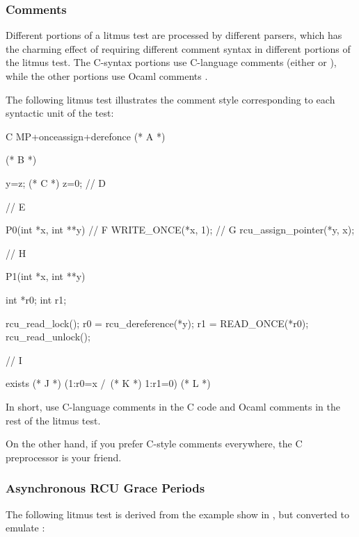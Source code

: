 \subsubsection{Comments}

Different portions of a litmus test are processed by different parsers,
which has the charming effect of requiring different comment syntax in
different portions of the litmus test.
The C-syntax portions use C-language comments (either \qco{/* */} or \qco{//}),
while the other portions use Ocaml comments \qco{(* *)}.

The following litmus test illustrates the comment style corresponding
to each syntactic unit of the test:

\begin{VerbatimN}[commandchars=\%\@\$]
	C MP+onceassign+derefonce (* A *)

	(* B *)

	{
	y=z; (* C *)
	z=0;
	} // D

	// E

	P0(int *x, int **y) // F
	{
		WRITE_ONCE(*x, 1);  // G
		rcu_assign_pointer(*y, x);
	}

	// H

	P1(int *x, int **y)
	{
		int *r0;
		int r1;

		rcu_read_lock();
		r0 = rcu_dereference(*y);
		r1 = READ_ONCE(*r0);
		rcu_read_unlock();
	}

	// I

	exists (* J *) (1:r0=x /\ (* K *) 1:r1=0) (* L *)
\end{VerbatimN}

In short, use C-language comments in the C code and Ocaml comments in
the rest of the litmus test.

On the other hand, if you prefer C-style comments everywhere, the
C preprocessor is your friend.


\subsubsection{Asynchronous RCU Grace Periods}

The following litmus test is derived from the example show in
, but
converted to emulate :

